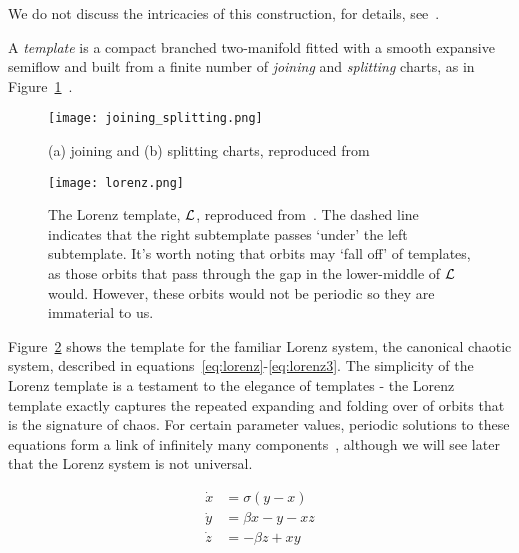 \documentclass[paper.tex]{subfiles}
\begin{document}
We do not discuss the intricacies of this construction, for details, see~\cite{bw1983b}.


\begin{definition}[Template]
  A \emph{template} is a compact branched two-manifold fitted with a smooth expansive semiflow and built from a finite number of \emph{joining} and \emph{splitting} charts, as in Figure~\ref{fig:joinsplit}~\cite{knottyode}.\label{def:template}
\end{definition}


\begin{figure}[h]
  \centering
  \texttt{[image: joining\_splitting.png]}
  \caption[what goes here]{(a) joining and (b) splitting charts, reproduced from~\cite{knottyode}\protect\footnotemark}\label{fig:joinsplit}
\end{figure}






\begin{figure}[h]
  \centering
  \texttt{[image: lorenz.png]}
  \caption{The Lorenz template, $\mathcal{L}$, reproduced from~\cite{knottyode}. The dashed line indicates that the right subtemplate passes `under' the left subtemplate. It's worth noting that orbits may `fall off' of templates, as those orbits
  that pass through the gap in the lower-middle of $\mathcal{L}$ would. However, these orbits would not be periodic so they are immaterial to us.}\label{fig:lorenz}
\end{figure}

Figure~\ref{fig:lorenz} shows the template for the familiar Lorenz system, the canonical chaotic system, described in equations~\ref{eq:lorenz}-\ref{eq:lorenz3}. The simplicity of the Lorenz template is a testament to the elegance of
templates - the Lorenz template exactly captures the repeated expanding and folding over of orbits that is the signature of chaos. For certain parameter values, periodic solutions to these equations form a link of infinitely
many components~\cite{knottyode}, although we will see later that the Lorenz system is not universal.

\begin{align}
  \label{eq:lorenz}
  \dot{x} &= \sigma(y - x ) \\
  \label{eq:lorenz2}
  \dot{y} &= \beta x - y - x z \\
  \label{eq:lorenz3}
  \dot{z} &= - \beta z + x y
\end{align}
\end{document}
